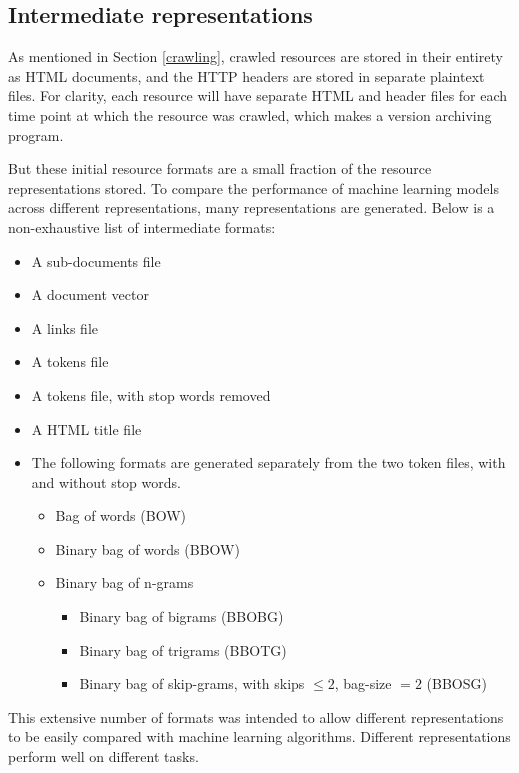 \subsection{Intermediate representations\label{repr}}
As mentioned in Section \ref{crawling}, crawled resources are stored
in their entirety as HTML documents, and the HTTP headers are
stored in separate plaintext files.  For clarity, each
resource will have separate HTML and header files for each
time point at which the resource was crawled, which makes
\nr{} a version archiving program.

But these initial resource formats are a small fraction of the
resource representations stored.  To compare the performance of
machine learning models across different representations,
many representations are generated. Below is a non-exhaustive
list of intermediate formats:
\begin{itemize}
    \item A sub-documents file
    \item A document vector
    \item A links file
    \item A tokens file
    \item A tokens file, with stop words removed
    \item A HTML title file
    \item The following formats are generated separately from the
          two token files, with and without stop words.
    \begin{itemize}
        \item Bag of words (BOW)
        \item Binary bag of words (BBOW)
        \item Binary bag of n-grams
        \begin{itemize}
            \item Binary bag of bigrams (BBOBG)
            \item Binary bag of trigrams (BBOTG)
            \item Binary bag of skip-grams, with skips
                  $\le 2$, bag-size $= 2$ (BBOSG)
        \end{itemize}
    \end{itemize}
\end{itemize}
This extensive number of formats was intended to allow different
representations to be easily compared with machine learning algorithms.
Different representations perform well on different tasks.
